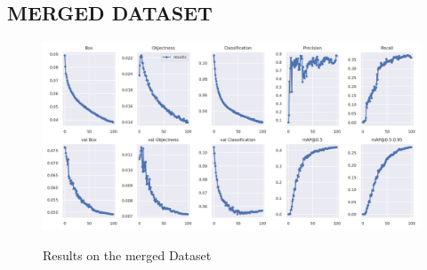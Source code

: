 \documentclass[conference]{IEEEtran}
\begin{document}
\subsection{MERGED DATASET}
\begin{figure}[h]
    \centering
    \includegraphics[width=0.9\linewidth]{Experiments/Merged/results.png}\\
    \caption{Results on the merged Dataset}
    \label{fig12}
\end{figure}
\end{document}
